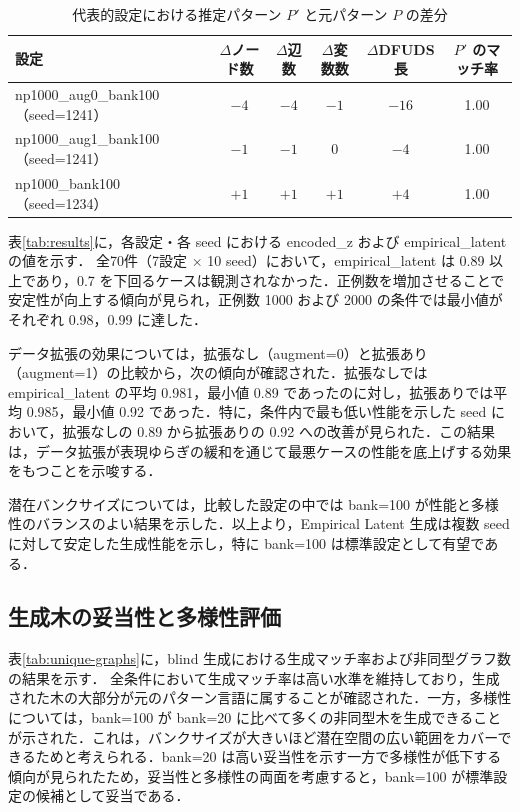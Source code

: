 \documentclass[submit,techrep,noauthor]{ipsj}
\begin{document}
\begin{table}[t]
\centering
\small
\caption{代表的設定における推定パターン $P'$ と元パターン $P$ の差分}
\label{tab:pattern-diff}
\begin{tabular}{lccccc}
\toprule
設定 & $\Delta$ノード数 & $\Delta$辺数 & $\Delta$変数数 & $\Delta$DFUDS長 & $P'$ のマッチ率 \\
\midrule
np1000\_aug0\_bank100（seed=1241） & $-4$ & $-4$ & $-1$ & $-16$ & 1.00 \\
np1000\_aug1\_bank100（seed=1241） & $-1$ & $-1$ & $0$  & $-4$  & 1.00 \\
np1000\_bank100（seed=1234）       & $+1$ & $+1$ & $+1$ & $+4$  & 1.00 \\
\bottomrule
\end{tabular}
\end{table}

表\ref{tab:results}に，各設定・各 seed における encoded\_z および empirical\_latent の値を示す．
全70件（7設定 × 10 seed）において，empirical\_latent は 0.89 以上であり，0.7 を下回るケースは観測されなかった．正例数を増加させることで安定性が向上する傾向が見られ，正例数 1000 および 2000 の条件では最小値がそれぞれ 0.98，0.99 に達した．

データ拡張の効果については，拡張なし（augment=0）と拡張あり（augment=1）の比較から，次の傾向が確認された．拡張なしでは empirical\_latent の平均 0.981，最小値 0.89 であったのに対し，拡張ありでは平均 0.985，最小値 0.92 であった．特に，条件内で最も低い性能を示した seed において，拡張なしの 0.89 から拡張ありの 0.92 への改善が見られた．この結果は，データ拡張が表現ゆらぎの緩和を通じて最悪ケースの性能を底上げする効果をもつことを示唆する．

潜在バンクサイズについては，比較した設定の中では bank=100 が性能と多様性のバランスのよい結果を示した．以上より，Empirical Latent 生成は複数 seed に対して安定した生成性能を示し，特に bank=100 は標準設定として有望である．

\subsection{生成木の妥当性と多様性評価}

表\ref{tab:unique-graphs}に，blind 生成における生成マッチ率および非同型グラフ数の結果を示す．
全条件において生成マッチ率は高い水準を維持しており，生成された木の大部分が元のパターン言語に属することが確認された．一方，多様性については，bank=100 が bank=20 に比べて多くの非同型木を生成できることが示された．これは，バンクサイズが大きいほど潜在空間の広い範囲をカバーできるためと考えられる．bank=20 は高い妥当性を示す一方で多様性が低下する傾向が見られたため，妥当性と多様性の両面を考慮すると，bank=100 が標準設定の候補として妥当である．
\end{document}

